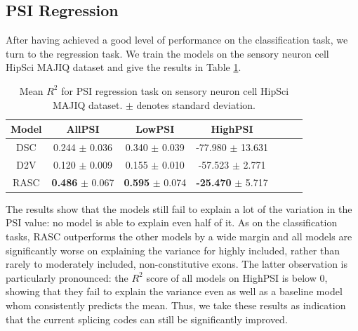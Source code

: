 \subsection{PSI Regression} \label{subsubsec:psi_regression}
After having achieved a good level of performance on the classification task, we turn to the regression task. We train the models on the sensory neuron cell HipSci MAJIQ dataset and give the results in Table \ref{table:psi_regression}. 


\begin{table}
	\centering
	\begin{tabular}{ c c c c c c c} 
		\hline
		Model & AllPSI &  LowPSI &  HighPSI \\
		\hline
		DSC	&	0.244   $\pm$	0.036	&	0.340	$\pm$	0.039	&	-77.980	$\pm$	13.631\\
		D2V	&	0.120	$\pm$	0.009	&	0.155	$\pm$	0.010	&	-57.523	$\pm$	2.771\\
		RASC	&	\textbf{0.486}	$\pm$	0.067	&	\textbf{0.595}	$\pm$	0.074	&	\textbf{-25.470}	$\pm$	5.717\\
		\hline
	\end{tabular}
	\caption{Mean $R^2$ for PSI regression task on sensory neuron cell HipSci MAJIQ dataset.  $\pm$ denotes standard deviation. 
	}
	\label{table:psi_regression}
\end{table}


The results show that the models still fail to explain a lot of the variation in the PSI value: no model is able to explain even half of it. 
As on the classification tasks, RASC outperforms the other models by a wide margin and all models are significantly worse on explaining the variance for highly included, rather than rarely to moderately included, non-constitutive exons. The latter observation is particularly pronounced: the $R^2$ score of all models on HighPSI is below 0, showing that they fail to explain the variance even as well as a baseline model whom consistently predicts the mean. Thus, we take these results as indication that the current splicing codes can still be significantly improved. 




